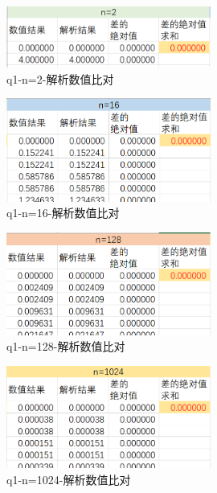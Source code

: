 \documentclass[10pt, a4paper]{article}
\begin{document}
    \begin{figure}[H]
        \centering
        \includegraphics[width=0.6\textwidth]{q1-n=2-解析数值比对.png}
        \caption{q1-n=2-解析数值比对}\label{fig:q1-n=2-解析数值比对}
    \end{figure}
    \begin{figure}[H]
        \centering
        \includegraphics[width=0.6\textwidth]{q1-n=16-解析数值比对.png}
        \caption{q1-n=16-解析数值比对}\label{fig:q1-n=16-解析数值比对}
    \end{figure}
    \begin{figure}[H]
        \centering
        \includegraphics[width=0.6\textwidth]{q1-n=128-解析数值比对.png}
        \caption{q1-n=128-解析数值比对}\label{fig:q1-n=128-解析数值比对}
    \end{figure}
    \begin{figure}[H]
        \centering
        \includegraphics[width=0.6\textwidth]{q1-n=1024-解析数值比对.png}
        \caption{q1-n=1024-解析数值比对}\label{fig:q1-n=1024-解析数值比对}
    \end{figure}
\end{document}
